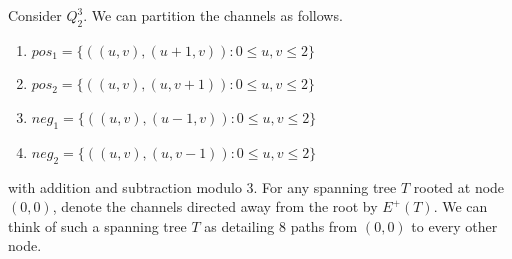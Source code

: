   \question Consider $Q_2^3$. We can partition the channels as follows.
  \begin{enumerate}
    \item $pos_1 = \{((u,v), (u+1,v)): 0 \leq u,v \leq 2\}$
    \item $pos_2 = \{((u,v), (u,v+1)): 0 \leq u,v \leq 2\}$
    \item $neg_1 = \{((u,v), (u-1,v)): 0 \leq u,v \leq 2\}$
    \item $neg_2 = \{((u,v), (u,v-1)): 0 \leq u,v \leq 2\}$
  \end{enumerate}
  with addition and subtraction modulo 3. For any spanning tree $T$ rooted at node $(0,0)$, denote the channels directed away from the root by $E^+(T).$ We can think of such a spanning tree $T$ as detailing 8 paths from $(0,0)$ to every other node.
